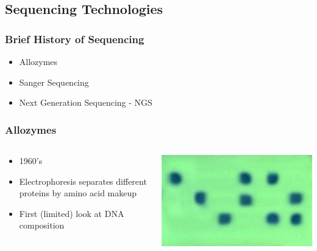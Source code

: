 \documentclass[14pt]{beamer}
\begin{document}
\subsection{Sequencing Technologies}

\begin{frame}
\frametitle{Brief History of Sequencing}
\begin{itemize}
	\item Allozymes
	\item Sanger Sequencing
	\item Next Generation Sequencing - NGS
\end{itemize}
\end{frame}

\begin{frame}
\frametitle{Allozymes}
\begin{columns}
	\begin{column}{0.6\textwidth}
		\begin{itemize}
			\item 1960's
			\item Electrophoresis separates different proteins by amino acid makeup
			\item First (limited) look at DNA composition
		\end{itemize}
	\end{column}
	\begin{column}{0.4\textwidth}
    	\begin{center}
     		\includegraphics[width=1\textwidth]{images_20170905_allozymes.jpg}
     	\end{center}
		\end{column}
	\end{columns}
\end{frame}
\end{document}
